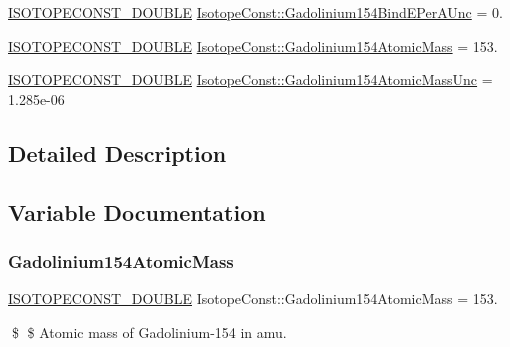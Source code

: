 \begin{DoxyCompactItemize}
\item 
\mbox{\hyperlink{group___isotope_const-_macros_ga8f45a7272ce02c0b4c65c44636ed719a}{I\+S\+O\+T\+O\+P\+E\+C\+O\+N\+S\+T\+\_\+\+D\+O\+U\+B\+LE}} \mbox{\hyperlink{group___isotope_const-_gadolinium-_gd154_gade39cff0d736db398b93d325c83f86ff}{Isotope\+Const\+::\+Gadolinium154\+Bind\+E\+Per\+A\+Unc}} = 0.
\item 
\mbox{\hyperlink{group___isotope_const-_macros_ga8f45a7272ce02c0b4c65c44636ed719a}{I\+S\+O\+T\+O\+P\+E\+C\+O\+N\+S\+T\+\_\+\+D\+O\+U\+B\+LE}} \mbox{\hyperlink{group___isotope_const-_gadolinium-_gd154_gac470f898672327de574d9055a6a0e31a}{Isotope\+Const\+::\+Gadolinium154\+Atomic\+Mass}} = 153.
\item 
\mbox{\hyperlink{group___isotope_const-_macros_ga8f45a7272ce02c0b4c65c44636ed719a}{I\+S\+O\+T\+O\+P\+E\+C\+O\+N\+S\+T\+\_\+\+D\+O\+U\+B\+LE}} \mbox{\hyperlink{group___isotope_const-_gadolinium-_gd154_gab393ab88f8b38e9f58c7ea8020f39db1}{Isotope\+Const\+::\+Gadolinium154\+Atomic\+Mass\+Unc}} = 1.\+285e-\/06
\end{DoxyCompactItemize}


\subsection{Detailed Description}


\subsection{Variable Documentation}
\mbox{\label{group___isotope_const-_gadolinium-_gd154_gac470f898672327de574d9055a6a0e31a}} 
\subsubsection{\texorpdfstring{Gadolinium154\+Atomic\+Mass}{Gadolinium154AtomicMass}}
{\footnotesize\ttfamily \mbox{\hyperlink{group___isotope_const-_macros_ga8f45a7272ce02c0b4c65c44636ed719a}{I\+S\+O\+T\+O\+P\+E\+C\+O\+N\+S\+T\+\_\+\+D\+O\+U\+B\+LE}} Isotope\+Const\+::\+Gadolinium154\+Atomic\+Mass = 153.}

\$ \$ Atomic mass of Gadolinium-\/154 in amu. \mbox{\label{group___isotope_const-_gadolinium-_gd154_gab393ab88f8b38e9f58c7ea8020f39db1}} 
